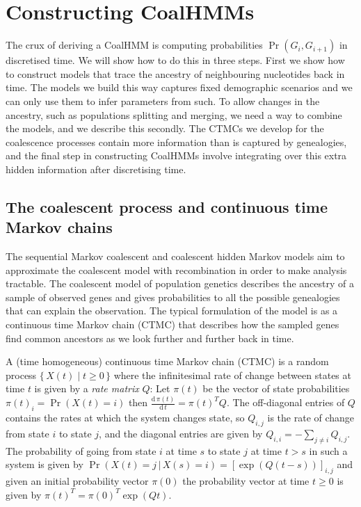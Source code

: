\documentclass[graybox]{svmult}
\begin{document}
\section{Constructing CoalHMMs}

The crux of deriving a CoalHMM is computing probabilities $\Pr(G_i,G_{i+1})$ in discretised time. We will show how to do this in three steps. First we show how to construct models that trace the ancestry of neighbouring nucleotides back in time. The models we build this way captures fixed demographic scenarios and we can only use them to infer parameters from such. To allow changes in the ancestry, such as populations splitting and merging, we need a way to combine the models, and we describe this secondly. The CTMCs we develop for the coalescence processes contain more information than is captured by genealogies, and the final step in constructing CoalHMMs involve integrating over this extra hidden information after discretising time.

\subsection{The coalescent process and continuous time Markov chains}

The sequential Markov coalescent and coalescent hidden Markov models aim to approximate the coalescent model with recombination in order to make analysis tractable. The coalescent model of population genetics describes the ancestry of a sample of observed genes and gives probabilities to all the possible genealogies that can explain the observation. The typical formulation of the model is as a continuous time Markov chain (CTMC) that describes how the sampled genes find common ancestors as we look further and further back in time. 

A (time homogeneous) continuous time Markov chain (CTMC) is a random process $\{\,X(t) \;|\; t \geq 0 \,\}$ where the infinitesimal rate of change between states at time $t$ is given by a \emph{rate matrix} $Q$: Let $\pi(t)$ be the vector of state probabilities $\pi(t)_i = \Pr(X(t)=i)$ then $\frac{\mathrm{d}\,\pi(t)}{\mathrm{d}\,t} = \pi(t)^TQ$. The off-diagonal entries of $Q$ contains the rates at which the system changes state, so $Q_{i,j}$ is the rate of change from state $i$ to state $j$, and the diagonal entries are given by $Q_{i,i} = - \sum_{j\neq i} Q_{i,j}$. The probability of going from state $i$ at time $s$ to state $j$ at time $t>s$ in such a system is given by $\Pr(X(t)=j\,|\,X(s)=i) = \left[\exp\left(Q\left(t-s\right)\right)\right]_{i,j}$ and given an initial probability vector $\pi(0)$ the probability vector at time $t\geq 0$ is given by $\pi(t)^T=\pi(0)^T\exp(Qt)$.
\end{document}
